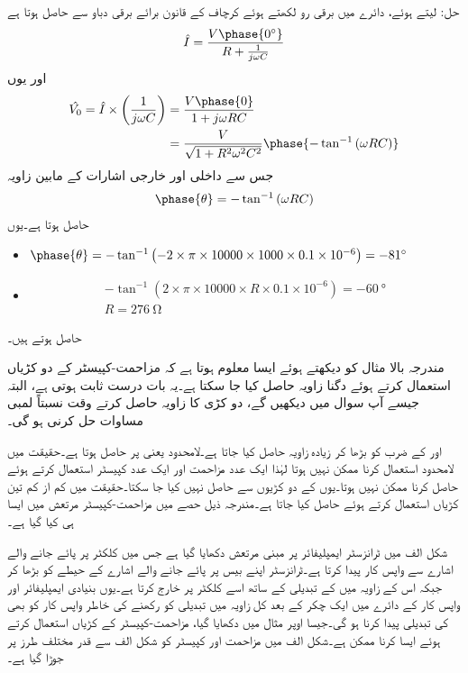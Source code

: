حل:
 لیتے ہوئے، دائرے میں برقی رو  لکھتے ہوئے کرچاف کے قانون برائے برقی دباو سے حاصل ہوتا ہے
\begin{align*}
\hat{I}=\frac{V \phase{\SI{0}{\degree}}}{R+\frac{1}{j\omega C}}
\end{align*}
اور یوں
\begin{align*}
\hat{V_0}= \hat{I} \times \left(\frac{1}{j\omega C} \right)&=\frac{V\phase{0}}{1+j \omega R C}\\
&=\frac{V}{\sqrt{1+R^2 \omega^2 C^2}} \phase{-\tan^{-1} \left(\omega R C \right)}
\end{align*}
جس سے داخلی اور خارجی اشارات کے مابین زاویہ
\begin{align*}
\phase{\theta}=-\tan^{-1} \left(\omega R C \right) 
\end{align*}
حاصل ہوتا ہے۔یوں
\begin{itemize}
\item
$\phase{\theta}=-\tan^{-1} \left(-2 \times \pi \times 10000\times 1000 \times 0.1 \times 10^{-6} \right)=\SI{-81}{\degree} $
\item
\begin{align*}
-\tan^{-1}\left(2 \times \pi \times 10000 \times R \times 0.1 \times 10^{-6}\right)=\SI{-60}{\degree}\\
R=\SI{276}{\ohm}
\end{align*}
\end{itemize}
حاصل ہوتے ہیں۔

مندرجہ بالا مثال کو دیکھتے ہوئے ایسا معلوم ہوتا ہے کہ مزاحمت-کپیسٹر کے دو کڑیاں استعمال کرتے ہوئے دگنا زاویہ حاصل کیا جا سکتا ہے۔یہ بات درست ثابت ہوتی ہے، البتہ جیسے آپ سوال  میں دیکھیں گے، دو کڑی  کا زاویہ حاصل کرتے وقت نسبتاً لمبی مساوات حل کرنی ہو گی۔

 اور  کے ضرب  کو بڑھا کر زیادہ زاویہ حاصل کیا جاتا ہے۔لامحدود  یعنی پر  حاصل ہوتا ہے۔حقیقت میں لامحدود  استعمال کرنا ممکن نہیں ہوتا لہٰذا ایک عدد مزاحمت اور ایک عدد کپیسٹر استعمال کرتے ہوئے  حاصل کرنا ممکن نہیں ہوتا۔یوں  کے دو کڑیوں سے  حاصل نہیں کیا جا سکتا۔حقیقت میں کم از کم تین  کڑیاں استعمال کرتے ہوئے  حاصل کیا جاتا ہے۔مندرجہ ذیل حصے میں مزاحمت-کپیسٹر مرتعش میں ایسا ہی کیا گیا ہے۔  


شکل  الف میں ٹرانزسٹر ایمپلیفائر پر مبنی مرتعش دکھایا گیا ہے جس میں کلکٹر پر پائے جانے والے اشارے  سے واپس کار   پیدا کرتا ہے۔ٹرانزسٹر اپنے  بیس پر پائے جانے والے اشارے کے حیطے کو بڑھا کر جبکہ اس کے زاویہ میں   کے تبدیلی کے ساتھ اسے کلکٹر پر خارج کرتا ہے۔یوں بنیادی ایمپلیفائر اور واپس کار کے دائرے میں ایک چکر کے بعد کل زاویہ میں تبدیلی کو  رکھنے کی خاطر واپس کار کو بھی  کی تبدیلی پیدا کرنا ہو گی۔جیسا اوپر مثال میں دکھایا گیا، مزاحمت-کپیسٹر  کے کڑیاں استعمال کرتے ہوئے ایسا کرنا ممکن ہے۔شکل  الف میں مزاحمت اور کپیسٹر کو  شکل  الف سے قدر مختلف طرز پر جوڑا گیا ہے۔ 

